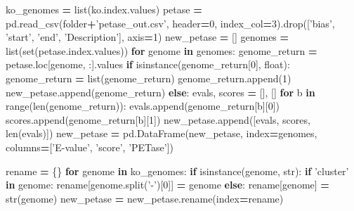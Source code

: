 \documentclass[
]{article}
\newenvironment{Shaded}{\begin{snugshade}}{\end{snugshade}}
\newcommand{\BuiltInTok}[1]{#1}
\newcommand{\ControlFlowTok}[1]{\textcolor[rgb]{0.13,0.29,0.53}{\textbf{#1}}}
\newcommand{\DecValTok}[1]{\textcolor[rgb]{0.00,0.00,0.81}{#1}}
\newcommand{\KeywordTok}[1]{\textcolor[rgb]{0.13,0.29,0.53}{\textbf{#1}}}
\newcommand{\NormalTok}[1]{#1}
\newcommand{\OperatorTok}[1]{\textcolor[rgb]{0.81,0.36,0.00}{\textbf{#1}}}
\newcommand{\StringTok}[1]{\textcolor[rgb]{0.31,0.60,0.02}{#1}}
\begin{document}
\begin{Shaded}
\begin{Highlighting}[]
\NormalTok{ko_genomes }\OperatorTok{=} \BuiltInTok{list}\NormalTok{(ko.index.values)}
\NormalTok{petase }\OperatorTok{=}\NormalTok{ pd.read_csv(folder}\OperatorTok{+}\StringTok{'petase_out.csv'}\NormalTok{, header}\OperatorTok{=}\DecValTok{0}\NormalTok{, index_col}\OperatorTok{=}\DecValTok{3}\NormalTok{).drop([}\StringTok{'bias'}\NormalTok{, }\StringTok{'start'}\NormalTok{, }\StringTok{'end'}\NormalTok{, }\StringTok{'Description'}\NormalTok{], axis}\OperatorTok{=}\DecValTok{1}\NormalTok{)}
\NormalTok{new_petase }\OperatorTok{=}\NormalTok{ []}
\NormalTok{genomes }\OperatorTok{=} \BuiltInTok{list}\NormalTok{(}\BuiltInTok{set}\NormalTok{(petase.index.values))}
\ControlFlowTok{for}\NormalTok{ genome }\KeywordTok{in}\NormalTok{ genomes:}
\NormalTok{  genome_return }\OperatorTok{=}\NormalTok{ petase.loc[genome, :].values}
  \ControlFlowTok{if} \BuiltInTok{isinstance}\NormalTok{(genome_return[}\DecValTok{0}\NormalTok{], }\BuiltInTok{float}\NormalTok{):}
\NormalTok{    genome_return }\OperatorTok{=} \BuiltInTok{list}\NormalTok{(genome_return)}
\NormalTok{    genome_return.append(}\DecValTok{1}\NormalTok{)}
\NormalTok{    new_petase.append(genome_return)}
  \ControlFlowTok{else}\NormalTok{:}
\NormalTok{    evals, scores }\OperatorTok{=}\NormalTok{ [], []}
    \ControlFlowTok{for}\NormalTok{ b }\KeywordTok{in} \BuiltInTok{range}\NormalTok{(}\BuiltInTok{len}\NormalTok{(genome_return)):}
\NormalTok{      evals.append(genome_return[b][}\DecValTok{0}\NormalTok{])}
\NormalTok{      scores.append(genome_return[b][}\DecValTok{1}\NormalTok{])}
\NormalTok{    new_petase.append([evals, scores, }\BuiltInTok{len}\NormalTok{(evals)])}
\NormalTok{new_petase }\OperatorTok{=}\NormalTok{ pd.DataFrame(new_petase, index}\OperatorTok{=}\NormalTok{genomes, columns}\OperatorTok{=}\NormalTok{[}\StringTok{'E-value'}\NormalTok{, }\StringTok{'score'}\NormalTok{, }\StringTok{'PETase'}\NormalTok{])}

\NormalTok{rename }\OperatorTok{=}\NormalTok{ \{\}}
\ControlFlowTok{for}\NormalTok{ genome }\KeywordTok{in}\NormalTok{ ko_genomes:}
  \ControlFlowTok{if} \BuiltInTok{isinstance}\NormalTok{(genome, }\BuiltInTok{str}\NormalTok{):}
    \ControlFlowTok{if} \StringTok{'cluster'} \KeywordTok{in}\NormalTok{ genome:}
\NormalTok{      rename[genome.split(}\StringTok{'-'}\NormalTok{)[}\DecValTok{0}\NormalTok{]] }\OperatorTok{=}\NormalTok{ genome}
  \ControlFlowTok{else}\NormalTok{:}
\NormalTok{    rename[genome] }\OperatorTok{=} \BuiltInTok{str}\NormalTok{(genome)}
\NormalTok{new_petase }\OperatorTok{=}\NormalTok{ new_petase.rename(index}\OperatorTok{=}\NormalTok{rename)}


\end{Highlighting}
\end{Shaded}
\end{document}
